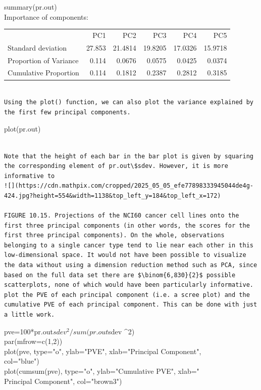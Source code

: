 \documentclass[10pt]{article}
\begin{document}
\begin{displayquote}
summary(pr.out)\\
Importance of components:
\end{displayquote}

\begin{center}
\begin{tabular}{lrrrrr}
 & PC1 & PC2 & PC3 & PC4 & PC5 \\
Standard deviation & 27.853 & 21.4814 & 19.8205 & 17.0326 & 15.9718 \\
Proportion of Variance & 0.114 & 0.0676 & 0.0575 & 0.0425 & 0.0374 \\
Cumulative Proportion & 0.114 & 0.1812 & 0.2387 & 0.2812 & 0.3185 \\
\end{tabular}
\end{center}

\begin{verbatim}

Using the plot() function, we can also plot the variance explained by the first few principal components.
\end{verbatim}

\begin{displayquote}
plot(pr.out)
\end{displayquote}

\begin{verbatim}

Note that the height of each bar in the bar plot is given by squaring the corresponding element of pr.out\$sdev. However, it is more informative to
![](https://cdn.mathpix.com/cropped/2025_05_05_efe77898333945044de4g-424.jpg?height=554&width=1138&top_left_y=184&top_left_x=172)

FIGURE 10.15. Projections of the NCI60 cancer cell lines onto the first three principal components (in other words, the scores for the first three principal components). On the whole, observations belonging to a single cancer type tend to lie near each other in this low-dimensional space. It would not have been possible to visualize the data without using a dimension reduction method such as PCA, since based on the full data set there are $\binom{6,830}{2}$ possible scatterplots, none of which would have been particularly informative.
plot the PVE of each principal component (i.e. a scree plot) and the cumulative PVE of each principal component. This can be done with just a little work.
\end{verbatim}

\begin{displayquote}
pve=100*pr.out$sdev^2/sum(pr.out$sdev \^{}2)\\
par(mfrow=c(1,2))\\
plot(pve, type="o", ylab="PVE", xlab="Principal Component",\\
col="blue")\\
plot(cumsum(pve), type="o", ylab="Cumulative PVE", xlab="\\
Principal Component", col="brown3")
\end{displayquote}
\end{document}
